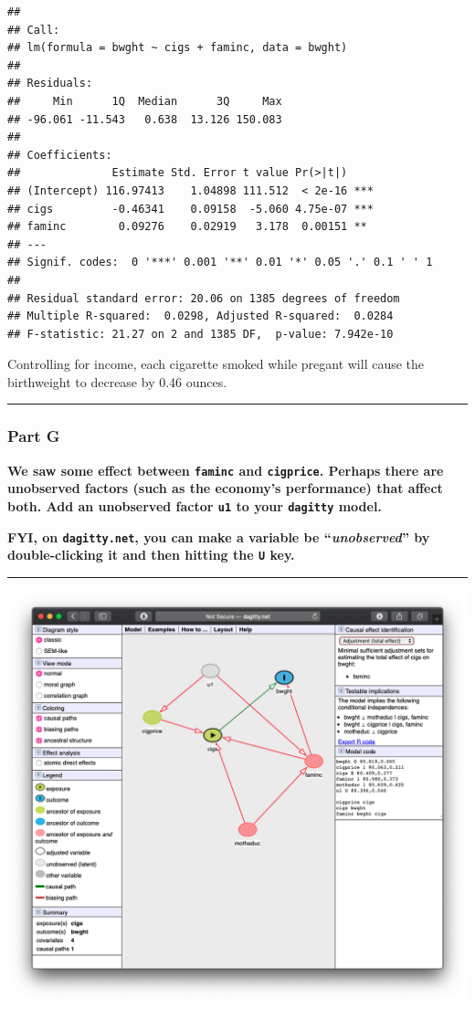 \documentclass[
]{article}
\begin{document}
\begin{verbatim}
## 
## Call:
## lm(formula = bwght ~ cigs + faminc, data = bwght)
## 
## Residuals:
##     Min      1Q  Median      3Q     Max 
## -96.061 -11.543   0.638  13.126 150.083 
## 
## Coefficients:
##              Estimate Std. Error t value Pr(>|t|)    
## (Intercept) 116.97413    1.04898 111.512  < 2e-16 ***
## cigs         -0.46341    0.09158  -5.060 4.75e-07 ***
## faminc        0.09276    0.02919   3.178  0.00151 ** 
## ---
## Signif. codes:  0 '***' 0.001 '**' 0.01 '*' 0.05 '.' 0.1 ' ' 1
## 
## Residual standard error: 20.06 on 1385 degrees of freedom
## Multiple R-squared:  0.0298, Adjusted R-squared:  0.0284 
## F-statistic: 21.27 on 2 and 1385 DF,  p-value: 7.942e-10
\end{verbatim}

Controlling for income, each cigarette smoked while pregant will cause
the birthweight to decrease by 0.46 ounces.

\begin{center}\rule{0.5\linewidth}{0.5pt}\end{center}

\hypertarget{part-g}{%
\subsubsection{Part G}\label{part-g}}

\textbf{We saw some effect between \texttt{faminc} and
\texttt{cigprice}. Perhaps there are unobserved factors (such as the
economy's performance) that affect both. Add an unobserved factor
\texttt{u1} to your \texttt{dagitty} model.}

\textbf{FYI, on \texttt{dagitty.net}, you can make a variable be
``\emph{unobserved}'' by double-clicking it and then hitting the
\texttt{U} key.}

\begin{center}\rule{0.5\linewidth}{0.5pt}\end{center}

\includegraphics{../images/9dagitty.png}
\end{document}
